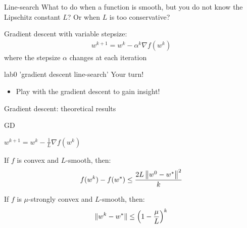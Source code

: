 \begin{frame}{Line-search }
    What to do when a function is smooth, but you do not know the Lipschitz constant $L$? Or when $L$ is too conservative?

    \pause
    Gradient descent with variable stepsize:
    \begin{align*}
        w^{k+1} = w^k - \alpha^k \nabla f (w^k)
    \end{align*}
    where the stepsize $\alpha$ changes at each iteration
\end{frame}

\begin{frame}{lab0 'gradient descent line-search'}
    Your turn!

    \begin{itemize}
        \item  Play with the gradient descent to gain insight!
    \end{itemize}

\end{frame}


\begin{frame}{Gradient descent: theoretical results}
    \begin{algorithm}[H]
        \caption{GD}
                {
                $w^{k+1} = w^k - \frac{1}{L} \nabla f (w^k)$
                }
    \end{algorithm}
    \pause
    \begin{proposition}
        If $f$ is convex and $L$-smooth, then:
        \[
        f(w^{k}) - f(w^*)
        \leq
        \frac{2 L \left\lVert {w^0 - w^*} \right\rVert^2}{k}
        \]
    \end{proposition}
    \pause
    \begin{proposition}
        If $f$ is $\mu$-strongly convex and $L$-smooth, then:
        \[
        \lVert {w^{k} - w^*} \rVert
        \leq
        \left (
            1 - \frac{\mu}{L}
        \right)^k
        \]
    \end{proposition}
\end{frame}

